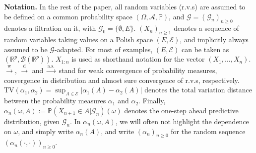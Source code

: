 \documentclass{article}
\theoremstyle{definition}
\renewcommand{\&}{and}
\begin{document}







\noindent \textbf{Notation.} In the rest of the paper, all random variables (r.v.s) are assumed to be defined on a common probability space $(\Omega,\mathcal{A},\mathbb{P})$, and $\mathcal{G}=(\mathcal{G}_{n})_{n\geq 0}$ denotes a filtration on it, with $\mathcal{G}_{0}=\{\emptyset,E\}$. $(X_{n})_{n\geq 1}$ denotes a sequence of random variables taking values on a Polish space $(E,\mathcal{E})$, and implicitly always assumed to be $\mathcal{G}$-adapted. %
For most of examples, $(E,\mathcal{E})$ can be taken as $(\mathbb{R}^{p},\mathcal{B}(\mathbb{R}^{p}))$. $X_{1:n}$ is used as shorthand notation for the vector $(X_{1},\ldots,X_{n})$. %
$\stackrel{\text{w}}{\to}$, $\stackrel{\text{d}}{\to}$ and $\stackrel{\text{a.s.}}{\to}$ stand for weak convergence of probability measures, convergence in distribution and almost sure convergence of r.v.s, respectively. $\text{TV}(\alpha_{1},\alpha_{2})= \sup_{A\in \mathcal{E}}|\alpha_{1}(A)-\alpha_{2}(A)|$ denotes the total variation distance between the probability measures $\alpha_{1}$ and $\alpha_{2}$.  %
Finally, $\alpha_{n}(\omega,A) := \mathbb{P}\left( X_{n+1}\in A | \mathcal{G}_{n} \right)(\omega)$ denotes the one-step ahead predictive distribution, given $\mathcal{G}_{n}$. In $\alpha_{n}(\omega,A)$, we will often not highlight the dependence on $\omega$, and simply write $\alpha_{n}(A)$, and write $(\alpha_n)_{n \geq 0}$ for the random sequence $(\alpha_n(\cdot,\cdot))_{n \geq 0}$.
\end{document}

